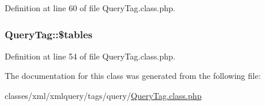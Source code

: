 Definition at line 60 of file Query\+Tag.\+class.\+php.

\subsubsection[{\texorpdfstring{\$tables}{$tables}}]{\setlength{\rightskip}{0pt plus 5cm}Query\+Tag\+::\$tables}\hypertarget{classQueryTag_aed79c0c40d39fe9042ade3b23b6e172e}{}\label{classQueryTag_aed79c0c40d39fe9042ade3b23b6e172e}


Definition at line 54 of file Query\+Tag.\+class.\+php.



The documentation for this class was generated from the following file\+:\begin{DoxyCompactItemize}
\item 
classes/xml/xmlquery/tags/query/\hyperlink{QueryTag_8class_8php}{Query\+Tag.\+class.\+php}\end{DoxyCompactItemize}
